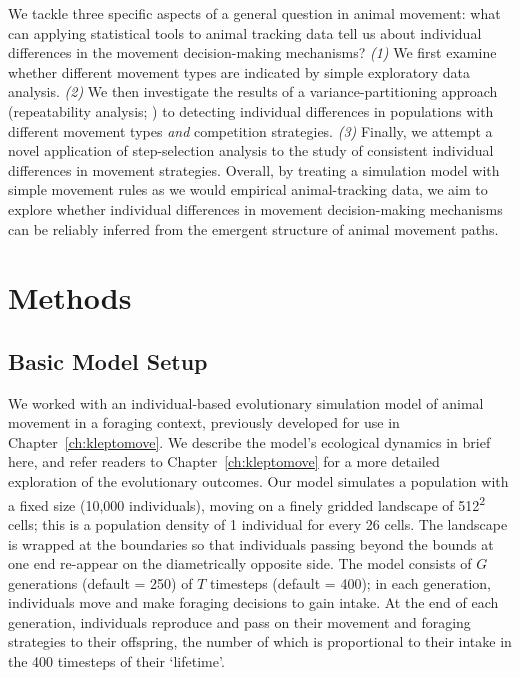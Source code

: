 We tackle three specific aspects of a general question in animal movement: what can applying statistical tools to animal tracking data tell us about individual differences in the movement decision-making mechanisms?
\textit{(1)} We first examine whether different movement types are indicated by simple exploratory data analysis.
\textit{(2)} We then investigate the results of a variance-partitioning approach (repeatability analysis; \citealt{nakagawa2010,hertel2019}) to detecting individual differences in populations with different movement types \textit{and} competition strategies.
\textit{(3)} Finally, we attempt a novel application of step-selection analysis to the study of consistent individual differences in movement strategies.
Overall, by treating a simulation model with simple movement rules as we would empirical animal-tracking data, we aim to explore whether individual differences in movement decision-making mechanisms can be reliably inferred from the emergent structure of animal movement paths.

\section*{Methods}

\subsection*{Basic Model Setup}

We worked with an individual-based evolutionary simulation model of animal movement in a foraging context, previously developed for use in Chapter~\ref{ch:kleptomove}.
We describe the model's ecological dynamics in brief here, and refer readers to Chapter~\ref{ch:kleptomove} for a more detailed exploration of the evolutionary outcomes.    
Our model simulates a population with a fixed size (10,000 individuals), moving on a finely gridded landscape of 512\textsuperscript{2} cells; this is a population density of 1 individual for every 26 cells.
The landscape is wrapped at the boundaries so that individuals passing beyond the bounds at one end re-appear on the diametrically opposite side.
The model consists of $G$ generations (default = 250) of $T$ timesteps (default = 400); in each generation, individuals move and make foraging decisions to gain intake.
At the end of each generation, individuals reproduce and pass on their movement and foraging strategies to their offspring, the number of which is proportional to their intake in the 400 timesteps of their `lifetime'.


